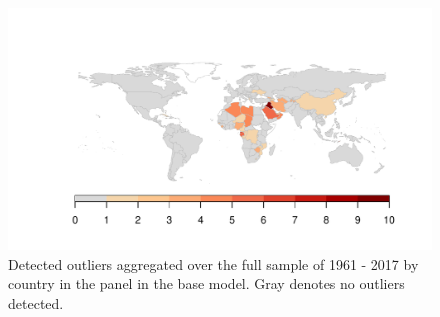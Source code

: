 \documentclass[11pt, letterpaper]{article}
\numberwithin{algorithm}{section}
\numberwithin{assumption}{section}
\numberwithin{lemma}{section}
\numberwithin{theorem}{section}
\numberwithin{corollary}{section}
\numberwithin{remark}{section}
\numberwithin{equation}{section}
\numberwithin{figure}{section}
\numberwithin{table}{section}
\begin{document}
\begin{figure}[!htbp]  \vspace{-.35in}
\centering
\includegraphics[width = \textwidth]{ctry_map.pdf}
\caption{Detected outliers aggregated over the full sample of 1961 - 2017 by country in the panel in the base model. Gray denotes no outliers detected. }
\label{fig_map_app1_appendix}
\end{figure}
\end{document}
